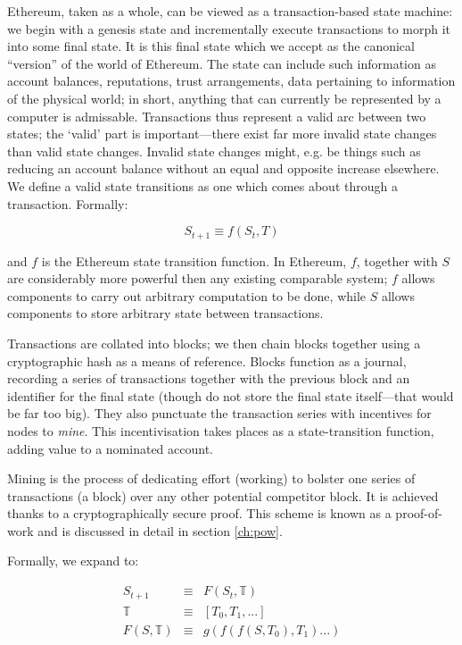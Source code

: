 \documentclass[9pt,oneside]{amsart}
\makeatletter
\newcommand*\eg{e.g.\@\xspace}
\makeatother
\begin{document}
\begin{multicols}{2}
Ethereum, taken as a whole, can be viewed as a transaction-based state machine: we begin with a genesis state and incrementally execute transactions to morph it into some final state. It is this final state which we accept as the canonical ``version'' of the world of Ethereum. The state can include such information as account balances, reputations, trust arrangements, data pertaining to information of the physical world; in short, anything that can currently be represented by a computer is admissable. Transactions thus represent a valid arc between two states; the `valid' part is important---there exist far more invalid state changes than valid state changes. Invalid state changes might, \eg be things such as reducing an account balance without an equal and opposite increase elsewhere. We define a valid state transitions as one which comes about through a transaction. Formally:

\begin{equation}
S_{t+1} \equiv f(S_t, T)
\end{equation}

and $f$ is the Ethereum state transition function. In Ethereum, $f$, together with $S$ are considerably more powerful then any existing comparable system; $f$ allows components to carry out arbitrary computation to be done, while $S$ allows components to store arbitrary state between transactions.

Transactions are collated into blocks; we then chain blocks together using a cryptographic hash as a means of reference. Blocks function as a journal, recording a series of transactions together with the previous block and an identifier for the final state (though do not store the final state itself---that would be far too big). They also punctuate the transaction series with incentives for nodes to \textit{mine}. This incentivisation takes places as a state-transition function, adding value to a nominated account.

Mining is the process of dedicating effort (working) to bolster one series of transactions (a block) over any other potential competitor block. It is achieved thanks to a cryptographically secure proof. This scheme is known as a proof-of-work and is discussed in detail in section \ref{ch:pow}.

Formally, we expand to:

\begin{eqnarray}
S_{t+1} & \equiv & F(S_t, \mathbb{T}) \\
\mathbb{T} & \equiv & [ T_0, T_1, ... ] \\
F(S, \mathbb{T}) & \equiv & g(f(f(S, T_0), T_1) ...)
\end{eqnarray}


\end{multicols}
\end{document}
